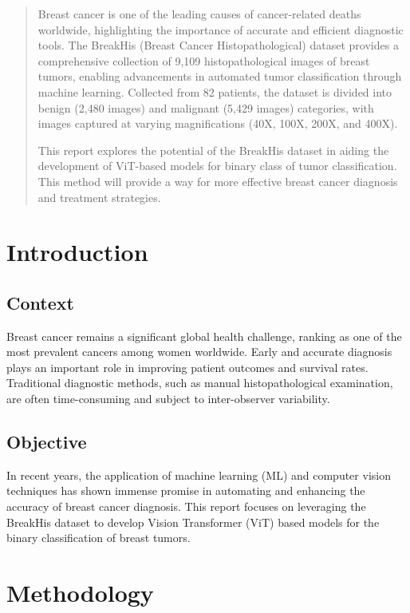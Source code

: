 \documentclass[twocolumn]{article}
\begin{document}
\twocolumn
\begin{abstract}
    Breast cancer is one of the leading causes of cancer-related deaths worldwide, highlighting the importance of accurate and efficient diagnostic tools. The BreakHis (Breast Cancer Histopathological) dataset \cite{Spanhol2016} \cite{BreakHis2016} provides a comprehensive collection of 9,109 histopathological images of breast tumors, enabling advancements in automated tumor classification through machine learning. Collected from 82 patients, the dataset is divided into benign (2,480 images) and malignant (5,429 images) categories, with images captured at varying magnifications (40X, 100X, 200X, and 400X).
    
    This report explores the potential of the BreakHis dataset in aiding the development of ViT-based models for binary class of tumor classification. This method will provide a way for more effective breast cancer diagnosis and treatment strategies.
\end{abstract}

\section{Introduction} 
\subsection{Context}
Breast cancer remains a significant global health challenge, ranking as one of the most prevalent cancers among women worldwide. Early and accurate diagnosis plays an important role in improving patient outcomes and survival rates. Traditional diagnostic methods, such as manual histopathological examination, are often time-consuming and subject to inter-observer variability. 

\subsection{Objective}
In recent years, the application of machine learning (ML) and computer vision techniques has shown immense promise in automating and enhancing the accuracy of breast cancer diagnosis. This report focuses on leveraging the BreakHis dataset to develop Vision Transformer (ViT) based models for the binary classification of breast tumors.

\section{Methodology}
\end{document}
